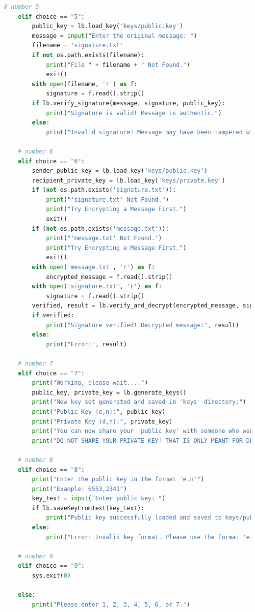 \documentclass[12pt,a4paper]{report}
\begin{document}
\begin{lstlisting}[language=Python]
    # number 5
    elif choice == "5":
        public_key = lb.load_key('keys/public.key')
        message = input("Enter the original message: ")
        filename = 'signature.txt'
        if not os.path.exists(filename):
            print("File " + filename + " Not Found.")
            exit()
        with open(filename, 'r') as f:
            signature = f.read().strip()
        if lb.verify_signature(message, signature, public_key):
            print("Signature is valid! Message is authentic.")
        else:
            print("Invalid signature! Message may have been tampered with.")

    # number 6
    elif choice == "6":
        sender_public_key = lb.load_key('keys/public.key')
        recipient_private_key = lb.load_key('keys/private.key')
        if (not os.path.exists('signature.txt')):
            print("'signature.txt' Not Found.")
            print("Try Encrypting a Message First.")
            exit()
        if (not os.path.exists('message.txt')):
            print("'message.txt' Not Found.")
            print("Try Encrypting a Message First.")
            exit()
        with open('message.txt', 'r') as f:
            encrypted_message = f.read().strip()
        with open('signature.txt', 'r') as f:
            signature = f.read().strip()
        verified, result = lb.verify_and_decrypt(encrypted_message, signature, sender_public_key, recipient_private_key)
        if verified:
            print("Signature verified! Decrypted message:", result)
        else:
            print("Error:", result)

    # number 7
    elif choice == "7":
        print("Working, please wait....")
        public_key, private_key = lb.generate_keys()
        print("New key set generated and saved in 'keys' directory:")
        print("Public Key (e,n):", public_key)
        print("Private Key (d,n):", private_key)
        print("You can now share your 'public key' with someone who wants to encrypt.")
        print("DO NOT SHARE YOUR PRIVATE KEY! THAT IS ONLY MEANT FOR DECRYPTION!")

    # number 8
    elif choice == "8":
        print("Enter the public key in the format 'e,n'")
        print("Example: 6553,2341")
        key_text = input("Enter public key: ")
        if lb.saveKeyFromText(key_text):
            print("Public key successfully loaded and saved to keys/public.key")
        else:
            print("Error: Invalid key format. Please use the format 'e,n' with numbers only")

    # number 9
    elif choice == "9":
        sys.exit(0)

    else:
        print("Please enter 1, 2, 3, 4, 5, 6, or 7.")
\end{lstlisting}
\end{document}
